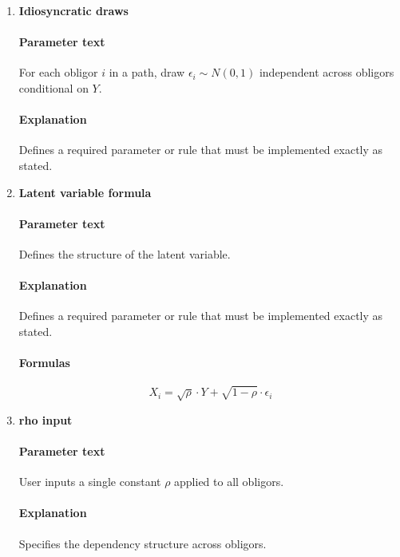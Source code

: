 \documentclass[11pt]{article}
\begin{document}
\begin{enumerate}[label=\arabic*),leftmargin=*,align=left]
\paragraph{Parameter text} For each MC path, draw one systematic factor $Y \sim N(0,1)$.
\paragraph{Explanation} Defines a required parameter or rule that must be implemented exactly as stated.

\item \textbf{Idiosyncratic draws}
\paragraph{Parameter text} For each obligor $i$ in a path, draw $\epsilon_i \sim N(0,1)$ independent across obligors conditional on $Y$.
\paragraph{Explanation} Defines a required parameter or rule that must be implemented exactly as stated.

\item \textbf{Latent variable formula}
\paragraph{Parameter text} Defines the structure of the latent variable.
\paragraph{Explanation} Defines a required parameter or rule that must be implemented exactly as stated.
\paragraph{Formulas} 
\[ X_i = \sqrt{\rho} \cdot Y + \sqrt{1-\rho} \cdot \epsilon_i \]

\item \textbf{rho input}
\paragraph{Parameter text} User inputs a single constant $\rho$ applied to all obligors.
\paragraph{Explanation} Specifies the dependency structure across obligors.


\end{enumerate}
\end{document}
